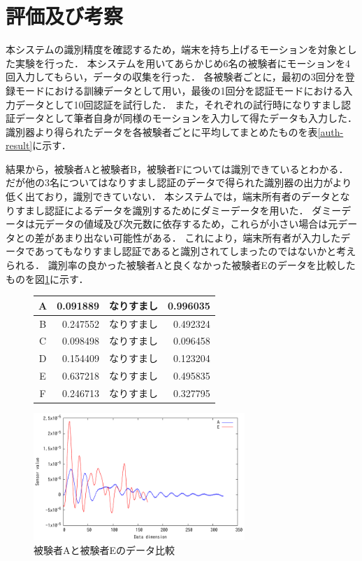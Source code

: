 \section{評価及び考察}
本システムの識別精度を確認するため，端末を持ち上げるモーションを対象とした実験を行った．
本システムを用いてあらかじめ6名の被験者にモーションを4回入力してもらい，データの収集を行った．
各被験者ごとに，最初の3回分を登録モードにおける訓練データとして用い，最後の1回分を認証モードにおける入力データとして10回認証を試行した．
また，それぞれの試行時になりすまし認証データとして筆者自身が同様のモーションを入力して得たデータも入力した．
識別器より得られたデータを各被験者ごとに平均してまとめたものを表\ref{auth-result}に示す．

結果から，被験者Aと被験者B，被験者Fについては識別できているとわかる．
だが他の3名についてはなりすまし認証のデータで得られた識別器の出力がより低く出ており，識別できていない．
本システムでは，端末所有者のデータとなりすまし認証によるデータを識別するためにダミーデータを用いた．
ダミーデータは元データの値域及び次元数に依存するため，これらが小さい場合は元データとの差があまり出ない可能性がある．
これにより，端末所有者が入力したデータであってもなりすまし認証であると識別されてしまったのではないかと考えられる．
識別率の良かった被験者Aと良くなかった被験者Eのデータを比較したものを図\ref{compare}に示す．

\begin{figure}[!tb]
  \def\@captype{table}
  \begin{minipage}{.48\textwidth}
    \centering
    \label{auth-result}
    \begin{tabular}{|c|r||c|r|} \hline
      A & 0.091889 & なりすまし & 0.996035 \\ \hline
      B & 0.247552 & なりすまし & 0.492324 \\ \hline
      C & 0.098498 & なりすまし & 0.096458 \\ \hline
      D & 0.154409 & なりすまし & 0.123204 \\ \hline
      E & 0.637218 & なりすまし & 0.495835 \\ \hline
      F & 0.246713 & なりすまし & 0.327795 \\ \hline
    \end{tabular}
  \end{minipage}
  \hfill
  \begin{minipage}{.48\textwidth}
    \centering
    \includegraphics[bb=0 0 360 216, width=8cm]{Graphs/comp.pdf}
    \caption{被験者Aと被験者Eのデータ比較}
    \label{compare}
  \end{minipage}
\end{figure}
